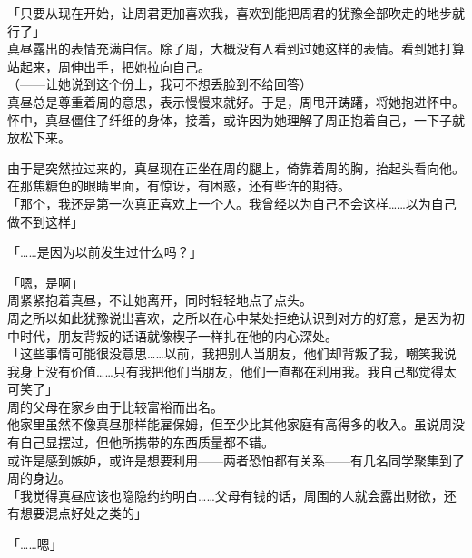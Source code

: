 「只要从现在开始，让周君更加喜欢我，喜欢到能把周君的犹豫全部吹走的地步就行了」\\

真昼露出的表情充满自信。除了周，大概没有人看到过她这样的表情。看到她打算站起来，周伸出手，把她拉向自己。\\

（——让她说到这个份上，我可不想丢脸到不给回答）\\

真昼总是尊重着周的意思，表示慢慢来就好。于是，周甩开踌躇，将她抱进怀中。\\

怀中，真昼僵住了纤细的身体，接着，或许因为她理解了周正抱着自己，一下子就放松下来。

由于是突然拉过来的，真昼现在正坐在周的腿上，倚靠着周的胸，抬起头看向他。\\

在那焦糖色的眼睛里面，有惊讶，有困惑，还有些许的期待。\\

「那个，我还是第一次真正喜欢上一个人。我曾经以为自己不会这样……以为自己做不到这样」

「……是因为以前发生过什么吗？」

「嗯，是啊」\\

周紧紧抱着真昼，不让她离开，同时轻轻地点了点头。\\

周之所以如此犹豫说出喜欢，之所以在心中某处拒绝认识到对方的好意，是因为初中时代，朋友背叛的话语就像楔子一样扎在他的内心深处。\\

「这些事情可能很没意思……以前，我把别人当朋友，他们却背叛了我，嘲笑我说我身上没有价值……只有我把他们当朋友，他们一直都在利用我。我自己都觉得太可笑了」\\

周的父母在家乡由于比较富裕而出名。\\

他家里虽然不像真昼那样能雇保姆，但至少比其他家庭有高得多的收入。虽说周没有自己显摆过，但他所携带的东西质量都不错。\\

或许是感到嫉妒，或许是想要利用——两者恐怕都有关系——有几名同学聚集到了周的身边。\\

「我觉得真昼应该也隐隐约约明白……父母有钱的话，周围的人就会露出财欲，还有想要混点好处之类的」

「……嗯」\\

